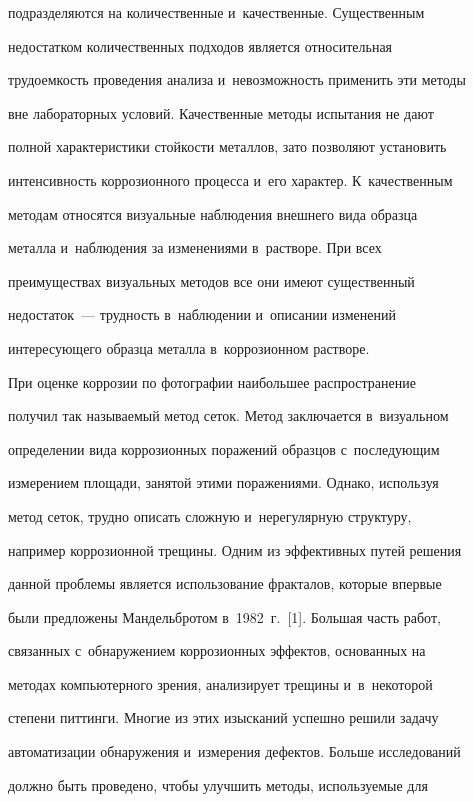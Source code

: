 подразделяются на количественные и~качественные. Существенным 


недостатком количественных подходов является относительная 


трудоемкость проведения анализа и~невозможность применить эти методы 


вне лабораторных условий. Качественные методы испытания не дают 


полной характеристики стойкости металлов, зато позволяют установить 


интенсивность коррозионного процесса и~его характер. К~качественным 


методам относятся визуальные наблюдения внешнего вида образца 


металла и~наблюдения за изменениями в~растворе. При всех 


преимуществах визуальных методов все они имеют существенный 


недостаток~--- трудность в~наблюдении и~описании изменений 


интересующего образца металла в~коррозионном растворе. 


   


   При оценке коррозии по фотографии наибольшее распространение 


получил так называемый метод сеток. Метод заключается в~визуальном 


определении вида коррозионных поражений образцов с~последующим 


измерением площади, занятой этими поражениями. Однако, используя 


метод сеток, трудно описать сложную и~нерегулярную структуру, 


например коррозионной трещины. Одним из эффективных путей решения 


данной проблемы является использование фракталов, которые впервые 


были предложены Мандельбротом в~1982~г.~[1]. Большая часть работ, 


связанных с~обнаружением коррозионных эффектов, основанных на 


методах компьютерного зрения, анализирует трещины и~в~некоторой 


степени питтинги. Многие из этих изысканий успешно решили задачу 


автоматизации обнаружения и~измерения дефектов. Больше исследований 


должно быть проведено, чтобы улучшить методы, используемые для 


